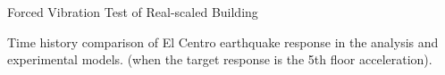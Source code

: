 \documentclass[usepdftitle=false]{beamer}
\begin{document}
\begin{frame}{Forced Vibration Test of Real-scaled Building}
\begin{figure}[!ht]
\centering
\setcounter{subfigure}{0}


\end{figure}
Time history comparison of El Centro earthquake response in the analysis and experimental models. (when the target response is the 5th floor acceleration).
\end{frame}
\end{document}
